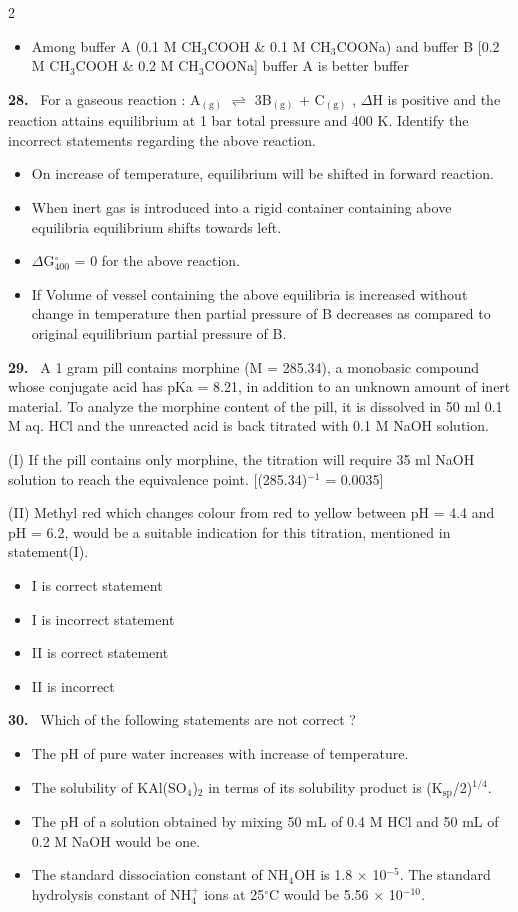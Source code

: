 \documentclass[10pt]{extarticle}
\newcommand{\qn}[1]{\par\smallskip\noindent\textbf{#1.}~}
\newenvironment{qoptions}{\begin{itemize}[leftmargin=1.8em,itemsep=1pt,topsep=2pt,label={}]}{\end{itemize}}
\newcommand{\opt}[2]{\item[(#1)] #2}
\begin{document}
\begin{multicols}{2}
\begin{qoptions}
\opt{D}{Among buffer A (0.1 M CH$_3$COOH \& 0.1 M CH$_3$COONa) and buffer B [0.2 M CH$_3$COOH \& 0.2 M CH$_3$COONa] buffer A is better buffer}
\end{qoptions}
\qn{28} For a gaseous reaction : A$_{(\mathrm g)}$ $\rightleftharpoons$ 3B$_{(\mathrm g)}$ + C$_{(\mathrm g)}$ , $\Delta$H is positive and the reaction attains equilibrium at 1 bar total pressure and 400 K. Identify the incorrect statements regarding the above reaction.
\begin{qoptions}
\opt{A}{On increase of temperature, equilibrium will be shifted in forward reaction.}
\opt{B}{When inert gas is introduced into a rigid container containing above equilibria equilibrium shifts towards left.}
\opt{C}{$\Delta$G$^\circ_{400}$ = 0 for the above reaction.}
\opt{D}{If Volume of vessel containing the above equilibria is increased without change in temperature then partial pressure of B decreases as compared to original equilibrium partial pressure of B.}
\end{qoptions}
\qn{29} A 1 gram pill contains morphine (M = 285.34), a monobasic compound whose conjugate acid has pKa = 8.21, in addition to an unknown amount of inert material. To analyze the morphine content of the pill, it is dissolved in 50 ml 0.1 M aq. HCl and the unreacted acid is back titrated with 0.1 M NaOH solution.\par
(I) If the pill contains only morphine, the titration will require 35 ml NaOH solution to reach the equivalence point. [(285.34)$^{-1}$ = 0.0035]\par
(II) Methyl red which changes colour from red to yellow between pH = 4.4 and pH = 6.2, would be a suitable indication for this titration, mentioned in statement(I).
\begin{qoptions}
\opt{A}{I is correct statement}
\opt{B}{I is incorrect statement}
\opt{C}{II is correct statement}
\opt{D}{II is incorrect}
\end{qoptions}
\qn{30} Which of the following statements are not correct ?
\begin{qoptions}
\opt{A}{The pH of pure water increases with increase of temperature.}
\opt{B}{The solubility of KAl(SO$_4$)$_2$ in terms of its solubility product is (K$_\mathrm{sp}$/2)$^{1/4}$.}
\opt{C}{The pH of a solution obtained by mixing 50 mL of 0.4 M HCl and 50 mL of 0.2 M NaOH would be one.}
\opt{D}{The standard dissociation constant of NH$_4$OH is 1.8 $\times$ 10$^{-5}$. The standard hydrolysis constant of NH$_4^+$ ions at 25$^\circ$C would be 5.56 $\times$ 10$^{-10}$.}
\end{qoptions}

\end{multicols}
\end{document}
